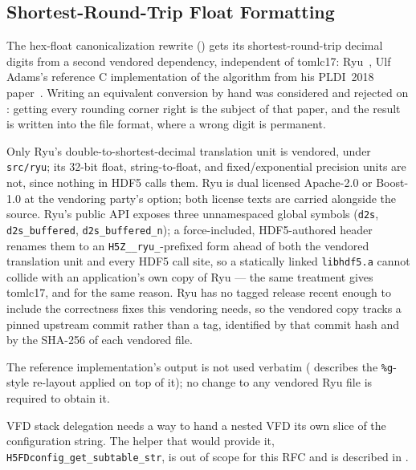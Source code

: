 \documentclass[../RFC-HDFG-2026-001.tex]{subfiles}
\begin{document}
\subsection{Shortest-Round-Trip Float Formatting}
\label{sec:ryu-vendoring}

The hex-float canonicalization rewrite ()
gets its shortest-round-trip decimal digits from a second vendored
dependency, independent of tomlc17: Ryu~\cite{ryu}, Ulf Adams's reference C
implementation of the algorithm from his PLDI~2018 paper~\cite{ryupaper}.
Writing an equivalent conversion by hand was considered and rejected on
\cite{hdf5issue6153}: getting every rounding corner right is the subject of
that paper, and the result is written into the file format, where a wrong
digit is permanent.

Only Ryu's double-to-shortest-decimal translation unit is vendored, under
\texttt{src/ryu}; its 32-bit float, string-to-float, and fixed/exponential
precision units are not, since nothing in HDF5 calls them.  Ryu is dual
licensed Apache-2.0 or Boost-1.0 at the vendoring party's option; both
license texts are carried alongside the source.  Ryu's public API exposes
three unnamespaced global symbols (\texttt{d2s}, \texttt{d2s\_buffered},
\texttt{d2s\_buffered\_n}); a force-included, HDF5-authored header renames
them to an \texttt{H5Z\_\_ryu\_}-prefixed form ahead of both the vendored
translation unit and every HDF5 call site, so a statically linked
\texttt{libhdf5.a} cannot collide with an application's own copy of
Ryu --- the same treatment  gives tomlc17, and
for the same reason.  Ryu has no tagged release recent enough to include the
correctness fixes this vendoring needs, so the vendored copy tracks a pinned
upstream commit rather than a tag, identified by that commit hash and by the
SHA-256 of each vendored file.

The reference implementation's output is not used verbatim
( describes the \texttt{\%g}-style re-layout
applied on top of it); no change to any vendored Ryu file is required to
obtain it.


\begin{outofscope}
VFD stack delegation needs a way to hand a nested VFD its own slice of the
configuration string.  The helper that would provide it,
\texttt{H5FDconfig\_get\_subtable\_str}, is out of scope for this RFC and is
described in .
\end{outofscope}
\end{document}
